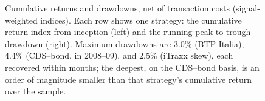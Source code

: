 

\begin{figure}[t]
\centering
{}
\caption{Cumulative returns and drawdowns, net of transaction costs
(signal-weighted indices). Each row shows one strategy: the cumulative return
index from inception (left) and the running peak-to-trough drawdown (right).
Maximum drawdowns are 3.0\% (BTP Italia), 4.4\% (CDS--bond, in 2008--09), and
2.5\% (iTraxx skew), each recovered within months; the deepest, on the
CDS--bond basis, is an order of magnitude smaller than that strategy's
cumulative return over the sample.
\label{fig:equity}}
\end{figure}


